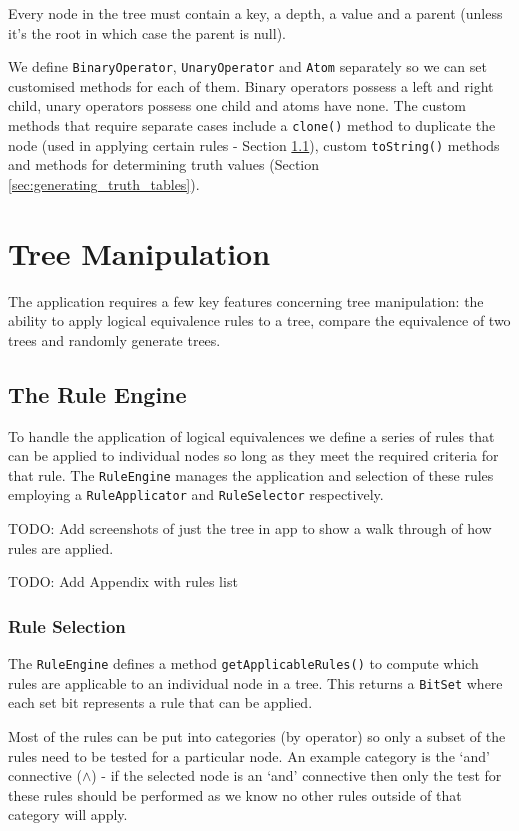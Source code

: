 \documentclass{report}
\begin{document}
Every node in the tree must contain a key, a depth, a value and a parent (unless it's the root in which case the parent is null).

We define {\tt BinaryOperator}, {\tt UnaryOperator} and {\tt Atom} separately so we can set customised methods for each of them. Binary operators possess a left and right child, unary operators possess one child and atoms have none. The custom methods that require separate cases include a {\tt clone()} method to duplicate the node (used in applying certain rules - Section \ref{sec:the_rule_engine}), custom {\tt toString()} methods and methods for determining truth values (Section \ref{sec:generating_truth_tables}).

\chapter{Tree Manipulation}

The application requires a few key features concerning tree manipulation: the ability to apply logical equivalence rules to a tree, compare the equivalence of two trees and randomly generate trees.

\section{The Rule Engine}
\label{sec:the_rule_engine}

To handle the application of logical equivalences we define a series of rules that can be applied to individual nodes so long as they meet the required criteria for that rule. The {\tt RuleEngine} manages the application and selection of these rules employing a {\tt RuleApplicator} and {\tt RuleSelector} respectively.

TODO: Add screenshots of just the tree in app to show a walk through of how rules are applied.

TODO: Add Appendix with rules list

\subsection{Rule Selection}
\label{sub:rule_selection}

The {\tt RuleEngine} defines a method {\tt getApplicableRules()} to compute which rules are applicable to an individual node in a tree. This returns a {\tt BitSet} where each set bit represents a rule that can be applied.

Most of the rules can be put into categories (by operator) so only a subset of the rules need to be tested for a particular node. An example category is the `and' connective ($\land$) - if the selected node is an `and' connective then only the test for these rules should be performed as we know no other rules outside of that category will apply.
\end{document}
